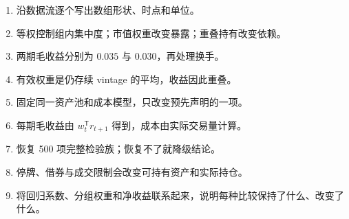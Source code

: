 \begin{enumerate}[leftmargin=*]
  \item 沿数据流逐个写出数组形状、时点和单位。
  \item 等权控制组内集中度；市值权重改变暴露；重叠持有改变依赖。
  \item 两期毛收益分别为 $0.035$ 与 $0.030$，再处理换手。
  \item 有效权重是仍存续 vintage 的平均，收益因此重叠。
  \item 固定同一资产池和成本模型，只改变预先声明的一项。
  \item 每期毛收益由 $w_t^{\mathsf T}r_{t+1}$ 得到，成本由实际交易量计算。
  \item 恢复 500 项完整检验族；恢复不了就降级结论。
  \item 停牌、借券与成交限制会改变可持有资产和实际持仓。
  \item 将回归系数、分组权重和净收益联系起来，说明每种比较保持了什么、改变了什么。
\end{enumerate}
